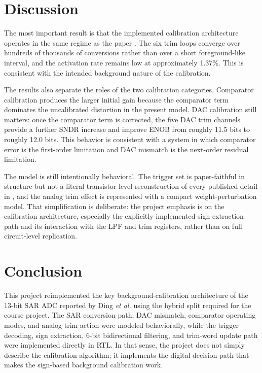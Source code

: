 \documentclass[11pt]{article}
\begin{document}
\section{Discussion}
The most important result is that the implemented calibration architecture operates in the same regime as the paper \cite{ding2017}. The six trim loops converge over hundreds of thousands of conversions rather than over a short foreground-like interval, and the activation rate remains low at approximately 1.37\%. This is consistent with the intended background nature of the calibration.

The results also separate the roles of the two calibration categories. Comparator calibration produces the larger initial gain because the comparator term dominates the uncalibrated distortion in the present model. DAC calibration still matters: once the comparator term is corrected, the five DAC trim channels provide a further SNDR increase and improve ENOB from roughly 11.5 bits to roughly 12.0 bits. This behavior is consistent with a system in which comparator error is the first-order limitation and DAC mismatch is the next-order residual limitation.

The model is still intentionally behavioral. The trigger set is paper-faithful in structure but not a literal transistor-level reconstruction of every published detail in \cite{ding2017}, and the analog trim effect is represented with a compact weight-perturbation model. That simplification is deliberate: the project emphasis is on the calibration architecture, especially the explicitly implemented sign-extraction path and its interaction with the LPF and trim registers, rather than on full circuit-level replication.

\section{Conclusion}
This project reimplemented the key background-calibration architecture of the 13-bit SAR ADC reported by Ding \emph{et al.} \cite{ding2017} using the hybrid split required for the course project. The SAR conversion path, DAC mismatch, comparator operating modes, and analog trim action were modeled behaviorally, while the trigger decoding, sign extraction, 6-bit bidirectional filtering, and trim-word update path were implemented directly in RTL. In that sense, the project does not simply describe the calibration algorithm; it implements the digital decision path that makes the sign-based background calibration work.
\end{document}
